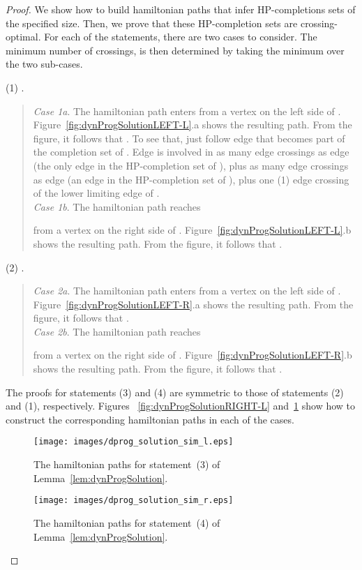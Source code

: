 \documentclass{myllncs-mixalis}
\begin{document}
\begin{proof}
We show how to build hamiltonian paths that infer HP-completions
sets of the specified size. Then, we prove that these HP-completion
sets are crossing-optimal. For each of the statements, there are two
cases to consider. The minimum number of crossings, is then
determined by taking the minimum over the two sub-cases.

 (1) . \begin{quote}
\hspace*{-.4cm}\emph{Case 1a}. The hamiltonian path
  enters  from a vertex on the left side of .
 Figure~\ref{fig:dynProgSolutionLEFT-L}.a shows the resulting path.
 From the figure, it follows that . To see that, just follow
 edge  that becomes part of the completion set of .
 Edge  is involved in as many edge crossings as edge 
 (the only edge in the HP-completion set of ),
 plus as many edge crossings as edge 
 (an edge in the HP-completion set of ), plus one (1) edge
 crossing of the lower
 limiting edge of .\\
\hspace*{-.4cm}\emph{Case 1b}. The hamiltonian path  reaches

 from a vertex on the right side of .
 Figure~\ref{fig:dynProgSolutionLEFT-L}.b shows the resulting path.
 From the figure, it follows that .
 \end{quote}

 (2) . \vspace*{-.4cm}
 \begin{quote}
\hspace*{-.4cm}\emph{Case 2a}. The hamiltonian path
  enters  from a vertex on the left side of .
 Figure~\ref{fig:dynProgSolutionLEFT-R}.a shows the resulting path.
 From the figure, it follows that .\\
\hspace*{-.4cm}\emph{Case 2b}. The hamiltonian path  reaches

 from a vertex on the right side of .
 Figure~\ref{fig:dynProgSolutionLEFT-R}.b shows the resulting path.
 From the figure, it follows that .
 \end{quote}
The proofs for statements (3) and (4) are symmetric to those of
statements (2) and (1), respectively. Figures
~\ref{fig:dynProgSolutionRIGHT-L}
and~\ref{fig:dynProgSolutionRIGHT-R} show how to construct the
corresponding hamiltonian paths in each of the cases.


\begin{figure}[htb]
  \begin{minipage}{.47\textwidth}
    \centering
    \texttt{[image: images/dprog\_solution\_sim\_l.eps]}
    \caption{The hamiltonian paths for statement~(3) of Lemma~\ref{lem:dynProgSolution}.}
    \label{fig:dynProgSolutionRIGHT-L}
  \end{minipage}
  \hfill
    \begin{minipage}{.47\textwidth}
    \centering
    \texttt{[image: images/dprog\_solution\_sim\_r.eps]}
    \caption{The hamiltonian paths for statement~(4) of Lemma~\ref{lem:dynProgSolution}.}
    \label{fig:dynProgSolutionRIGHT-R}
  \end{minipage}
\end{figure}


\end{proof}
\end{document}
